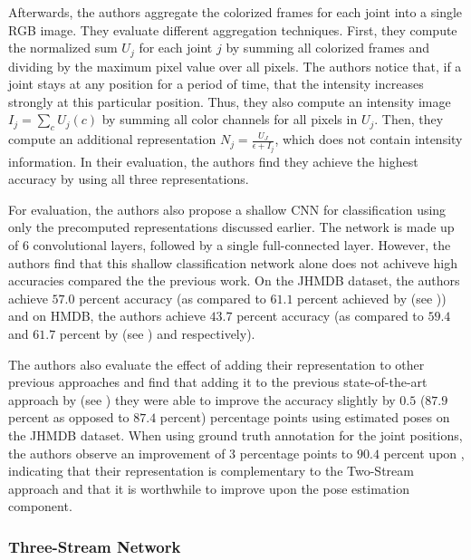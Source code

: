 Afterwards, the authors aggregate the colorized frames for each joint into a single RGB image.
They evaluate different aggregation techniques.
First, they compute the normalized sum $U_j$ for each joint $j$ by summing all colorized frames and dividing by the maximum pixel value over all pixels.
The authors notice that, if a joint stays at any position for a period of time, that the intensity increases strongly at this particular position.
Thus, they also compute an intensity image $I_j = \sum_c U_j(c)$ by summing all color channels for all pixels in $U_j$.
Then, they compute an additional representation $N_j = \frac{U_J}{\epsilon + I_j}$, which does not contain intensity information.
In their evaluation, the authors find they achieve the highest accuracy by using all three representations.

For evaluation, the authors also propose a shallow CNN for classification using only the precomputed representations discussed earlier.
The network is made up of $6$ convolutional layers, followed by a single full-connected layer.
However, the authors find that this shallow classification network alone does not achiveve high accuracies compared the the previous work.
On the JHMDB dataset, the authors achieve $57.0$ percent accuracy (as compared to $61.1$ percent achieved by \cite{cheron_pcnn_2015} (see )) and on HMDB, the authors achieve $43.7$ percent accuracy (as compared to $59.4$ and $61.7$ percent by \cite{simonyan_two-stream_2014} (see ) and \cite{wang_action_2013}  respectively).

The authors also evaluate the effect of adding their representation to other previous approaches and find that adding it to the previous state-of-the-art approach by \cite{carreira_quo_2017} (see ) they were able to improve the accuracy slightly by $0.5$ ($87.9$ percent as opposed to $87.4$ percent) percentage points using estimated poses on the JHMDB dataset.
When using ground truth annotation for the joint positions, the authors observe an improvement of $3$ percentage points to $90.4$ percent upon \cite{carreira_quo_2017}, indicating that their representation is complementary to the Two-Stream approach and that it is worthwhile to improve upon the pose estimation component.

\subsubsection{Three-Stream Network}
\label{sec:three-stream}

